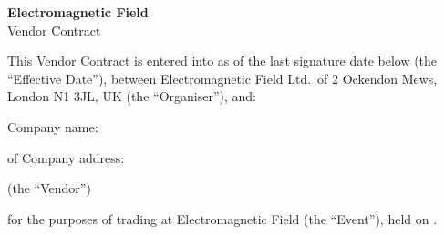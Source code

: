 

\selectfont

\begin{center}
{\bf \LARGE Electromagnetic Field \eventyear}\\[12pt]
{\Large Vendor Contract}
\end{center}

This Vendor Contract is entered into as of the last signature date below (the ``Effective Date''), between
Electromagnetic Field Ltd.\ of 2 Ockendon Mews, London N1 3JL, UK (the ``Organiser''), and:

Company name:
\vspace{0.3in}
\par\noindent\makebox[5in]{\hrulefill}

of
Company address:
\vspace{0.3in}
\par\noindent\makebox[5in]{\hrulefill}

(the ``Vendor'')

for the purposes of trading at Electromagnetic Field \eventyear (the ``Event''), held on \eventdates.

